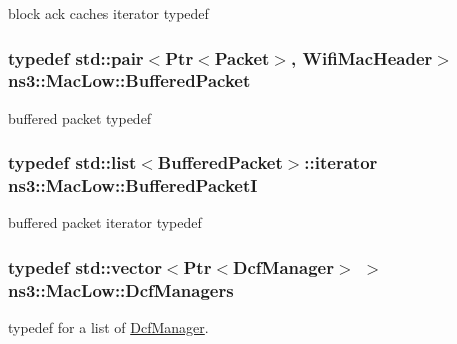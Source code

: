 block ack caches iterator typedef 

\subsubsection[{\texorpdfstring{Buffered\+Packet}{BufferedPacket}}]{\setlength{\rightskip}{0pt plus 5cm}typedef std\+::pair$<${\bf Ptr}$<${\bf Packet}$>$, {\bf Wifi\+Mac\+Header}$>$ {\bf ns3\+::\+Mac\+Low\+::\+Buffered\+Packet}\hspace{0.3cm}{\ttfamily [private]}}\hypertarget{classns3_1_1MacLow_ae78fc9611b47a682c09e6ffc9f798be3}{}\label{classns3_1_1MacLow_ae78fc9611b47a682c09e6ffc9f798be3}


buffered packet typedef 

\subsubsection[{\texorpdfstring{Buffered\+PacketI}{BufferedPacketI}}]{\setlength{\rightskip}{0pt plus 5cm}typedef {\bf std\+::list}$<${\bf Buffered\+Packet}$>$\+::iterator {\bf ns3\+::\+Mac\+Low\+::\+Buffered\+PacketI}\hspace{0.3cm}{\ttfamily [private]}}\hypertarget{classns3_1_1MacLow_ac5da0e8293b372fee7df425d9584c0b6}{}\label{classns3_1_1MacLow_ac5da0e8293b372fee7df425d9584c0b6}


buffered packet iterator typedef 

\subsubsection[{\texorpdfstring{Dcf\+Managers}{DcfManagers}}]{\setlength{\rightskip}{0pt plus 5cm}typedef std\+::vector$<${\bf Ptr}$<${\bf Dcf\+Manager}$>$ $>$ {\bf ns3\+::\+Mac\+Low\+::\+Dcf\+Managers}\hspace{0.3cm}{\ttfamily [private]}}\hypertarget{classns3_1_1MacLow_a22c50ed96b7e6b6cebe789abf1ce006b}{}\label{classns3_1_1MacLow_a22c50ed96b7e6b6cebe789abf1ce006b}
typedef for a list of \hyperlink{classns3_1_1DcfManager}{Dcf\+Manager}. 
